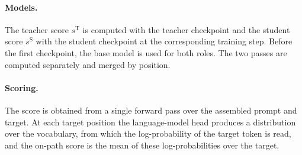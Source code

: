 \documentclass{article}
\newcommand{\sstud}{s^{\mathrm{S}}}          %
\newcommand{\steach}{s^{\mathrm{T}}}         %
\begin{document}
\paragraph{Models.}
The teacher score $\steach$ is computed with the teacher checkpoint and the
student score $\sstud$ with the student checkpoint at the corresponding training
step. Before the first checkpoint, the base model is used for both roles. The two
passes are computed separately and merged by position.

\paragraph{Scoring.}
The score is obtained from a single forward pass over the assembled prompt and
target. At each target position the language-model head produces a distribution
over the vocabulary, from which the log-probability of the target token is read,
and the on-path score is the mean of these log-probabilities over the target.
\end{document}
